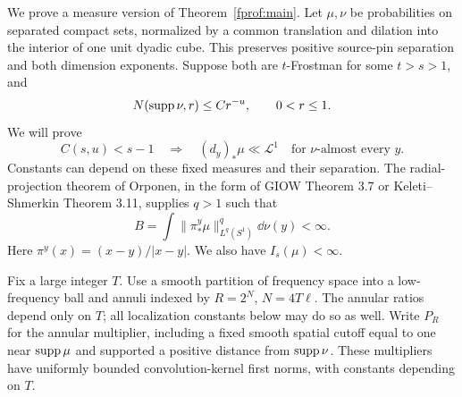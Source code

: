 We prove a measure version of Theorem~\ref{fprof:main}. Let \(\mu,\nu\) be probabilities on separated compact sets, normalized by a common translation and dilation into the interior of one unit
dyadic cube. This preserves positive source-pin separation and both dimension
exponents. Suppose both are \(t\)-Frostman for some \(t>s>1\), and
\begin{equation}\label{fprof:cover}
 N(\operatorname{supp}\nu,r)\leq C r^{-u},\qquad 0<r\leq1.
\end{equation}
We will prove
\begin{equation}\label{fprof:ac}
 C(s,u)<s-1\quad\Longrightarrow\quad
 (d_y)_*\mu\ll\mathcal L^1\quad\text{for \(\nu\)-almost every \(y\)}.
\end{equation}
Constants can depend on these fixed measures and their separation. The radial-projection theorem of Orponen, in the form of GIOW Theorem 3.7 or Keleti--Shmerkin Theorem 3.11, supplies \(q>1\) such that
\begin{equation}\label{fprof:radial}
 B=\int\|\pi^y_*\mu\|_{L^q(S^1)}^q\dd\nu(y)<\infty.
\end{equation}
Here \(\pi^y(x)=(x-y)/|x-y|\). We also have \(I_s(\mu)<\infty\).

Fix a large integer \(T\). Use a smooth partition of frequency space into a low-frequency ball and annuli indexed by \(R=2^N\), \(N=4T\ell\). The annular ratios depend only on \(T\); all localization constants below may do so as well. Write \(P_R\) for the annular multiplier, including a fixed smooth spatial cutoff equal to one near \(\operatorname{supp}\mu\) and supported a positive distance from \(\operatorname{supp}\nu\). These multipliers have uniformly bounded convolution-kernel first norms, with constants depending on \(T\).

